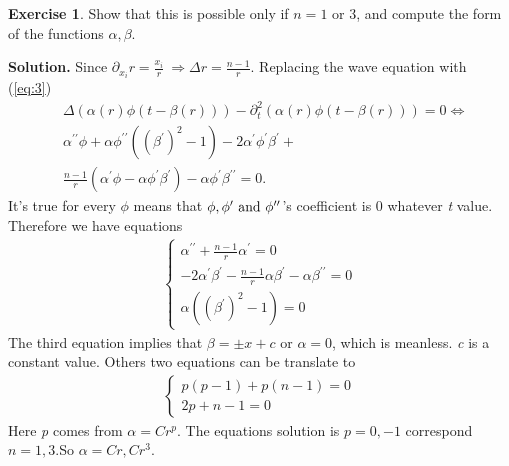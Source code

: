 \documentclass[a4paper]{book}
\newenvironment{solution}%
{\noindent\textbf{Solution.}}%
{\qedhere}
\numberwithin{equation}{chapter}
\theoremstyle{definition}
\newtheorem{exc}[exm]{Exercise}
\begin{document}
\begin{multicols}{2}
\begin{exc}
  Show that this is possible only if $n = 1$ or 3, and compute the form of the functions $\alpha , \beta$.
\end{exc}

\begin{solution}
  Since $\partial_{x_i} r = \frac{x_i}{r} \ \Longrightarrow \Delta r = \frac{n-1}{r}$. Replacing the wave equation with (\ref{eq:3})
  \begin{align*}
    &\Delta(\alpha(r) \phi (t - \beta(r))) - \partial_t^2(\alpha(r) \phi(t - \beta(r))) = 0 \Longleftrightarrow \\
    &\alpha^{\prime \prime} \phi + \alpha \phi^{\prime \prime} ({(\beta^\prime)}^2 - 1) - 2\alpha^\prime\phi^{\prime} \beta^\prime +\\ &\frac{n-1}{r}(\alpha^\prime \phi - \alpha \phi^\prime \beta^\prime) - \alpha \phi^\prime \beta^{\prime \prime} = 0.
  \end{align*}
  It's true for every $\phi$ means that $\phi, \phi^\prime \textmd{ and } \phi^{\prime \prime}$'s coefficient is 0 whatever \textit{t} value. Therefore we have equations
  \begin{align*}
    \begin{cases}
      \alpha^{\prime \prime} + \frac{n-1}{r} \alpha^\prime = 0 \\
      - 2\alpha^\prime \beta^\prime - \frac{n-1}{r} \alpha \beta^{\prime} - \alpha \beta^{\prime \prime} = 0 \\
      \alpha ({(\beta^\prime)}^2 - 1) = 0 
    \end{cases}
  \end{align*}
  The third equation implies that $\beta = \pm x + c$ or $\alpha = 0$, which is meanless. \textit{c} is a constant value. Others two equations can be translate to
  \begin{align*}
    \begin{cases}
      p(p-1) + p(n-1) = 0 \\
      2p + n-1 = 0
    \end{cases}
  \end{align*}
  Here \textit{p} comes from $\alpha = C r^p$. The equations solution is $p = 0, -1$ correspond $n = 1, 3$.So $\alpha = C r , C r^3$. 
\end{solution}


\end{multicols}
\end{document}
